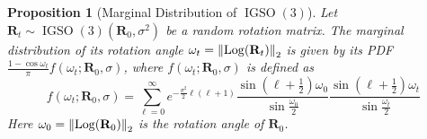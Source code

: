 \documentclass{article}
\theoremstyle{plain}
\newtheorem{proposition}[theorem]{Proposition}
\theoremstyle{definition}
\theoremstyle{remark}
\DeclareMathOperator{\IGSO}{IGSO}
\DeclareMathOperator{\Log}{\operatorname{Log}}
\begin{document}
\begin{proposition}[Marginal Distribution of $\IGSO(3)$]\label{prop:marginal_igso3}
    Let $\mathbf{R}_t \sim \IGSO(3)(\mathbf{R}_0, \sigma^2)$ be a random rotation matrix. The marginal distribution of its rotation angle $\omega_t = \norm{\Log(\mathbf{R}_t)}_2$ is given by its PDF $\frac{1-\cos\omega_t}{\pi}f(\omega_t; \mathbf{R}_0, \sigma)$, where $f(\omega_t; \mathbf{R}_0, \sigma)$ is defined as
    \begin{equation}
        f(\omega_t; \mathbf{R}_0, \sigma) = \sum_{\ell=0}^{\infty} e^{-\frac{\sigma^2}{2}\ell(\ell+1)}\frac{\sin\left(\ell+\frac{1}{2}\right)\omega_0}{\sin \frac{\omega_0}{2}}\frac{\sin\left(\ell+\frac{1}{2}\right)\omega_t}{\sin \frac{\omega_t}{2}}
    \end{equation}
    Here $\omega_0 = \norm{\Log(\mathbf{R}_0)}_2$ is the rotation angle of $\mathbf{R}_0$.
\end{proposition}
\end{document}
